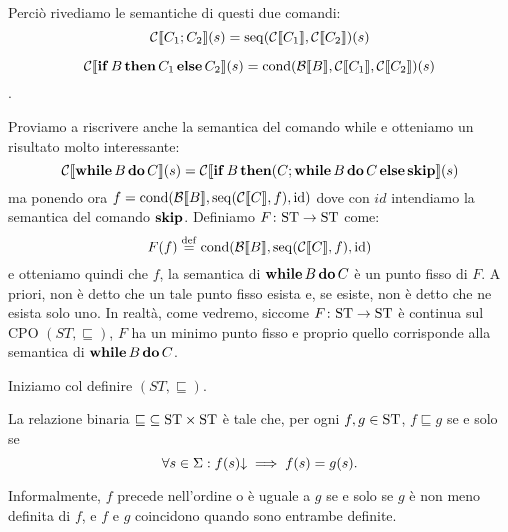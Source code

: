 Perciò rivediamo le semantiche di questi due comandi:
$$ \mathcal{C} \llbracket C_1 ; C_2 \rrbracket (s) = \mathrm{seq}(\mathcal{C} \llbracket C_1 \rrbracket, \mathcal{C} \llbracket C_2 \rrbracket)(s)$$

$$\mathcal{C} \llbracket \mathop{\textup{\textbf{if}}} B \mathop{\textup{\textbf{then}}} C_1 \mathop{\textup{\textbf{else}}} C_2 \rrbracket (s) = \mathrm{cond}(\mathcal{B} \llbracket B \rrbracket, \mathcal{C} \llbracket C_1 \rrbracket, \mathcal{C} \llbracket C_2 \rrbracket)(s)$$.

Proviamo a riscrivere anche la semantica del comando while e otteniamo un risultato molto interessante:
$$ \mathcal{C} \llbracket \mathop{\textup{\textbf{while}}} B \mathop{\textup{\textbf{do}}} C \rrbracket (s) = \mathcal{C} \llbracket \mathop{\textup{\textbf{if}}} B \mathop{\textup{\textbf{then}}} (C ; \mathop{\textup{\textbf{while}}} B \mathop{\textup{\textbf{do}}} C \mathop{\textup{\textbf{else}}} \mathop{\textup{\textbf{skip}}} \rrbracket (s)$$
ma ponendo ora $f = \mathrm{cond}(\mathcal{B} \llbracket B \rrbracket, \mathrm{seq}(\mathcal{C} \llbracket C \rrbracket, f), \mathrm{id})$ dove con $id$ intendiamo la semantica del comando $\mathop{\textup{\textbf{skip}}}$.
Definiamo $\mathord{F}\colon\mathrm{ST}\to\mathrm{ST}$ come:
\[
F(f) \defeq \cond(\calB \llbracket B \rrbracket, \seq(\calC \llbracket C \rrbracket, f), \mathrm{id})
\]
e otteniamo quindi che $f$, la semantica di $\mathop{\textup{\textbf{while}}} B \mathop{\textup{\textbf{do}}} C$ è un punto fisso
di $F$.
A priori, non \`e detto che un tale punto fisso esista e, se esiste,
non \`e detto che ne esista solo uno.
In realt\`a, come vedremo, siccome $\mathord{F}\colon\mathrm{ST}\to\mathrm{ST}$ \`e continua
sul CPO $(ST, \sqsubseteq)$, $F$ ha un minimo punto fisso e proprio
quello corrisponde alla semantica di $\mathop{\textup{\textbf{while}}} B \mathop{\textup{\textbf{do}}} C$.

Iniziamo col definire $(ST, \sqsubseteq)$.

\begin{definizione} 
La relazione binaria $\mathord{\sqsubseteq}\subseteq\mathrm{ST}\times\mathrm{ST}$ \`e tale che,
per ogni $f, g \in \mathrm{ST}$,  $f \sqsubseteq g$ se e solo se
\[
  \forall s \in \Sigma \mathrel{:} f(s)\mathord{\downarrow} \implies f(s) = g(s).
\]
\end{definizione}
Informalmente, $f$ precede nell'ordine o \`e uguale a $g$ se e solo se
$g$ è non meno definita di $f$, e $f$ e $g$ coincidono quando sono entrambe
definite.

